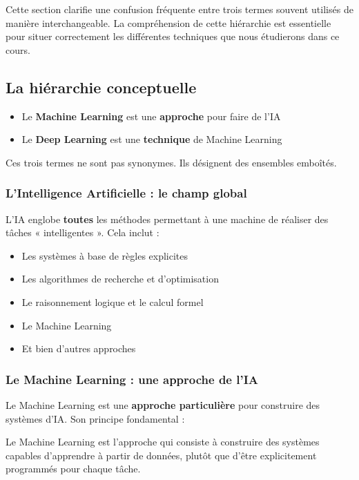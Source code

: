 \documentclass[11pt,a4paper]{article}
\begin{document}
Cette section clarifie une confusion fréquente entre trois termes souvent utilisés de manière interchangeable. La compréhension de cette hiérarchie est essentielle pour situer correctement les différentes techniques que nous étudierons dans ce cours.

\subsection{La hiérarchie conceptuelle}

\begin{retenirbox}
\begin{itemize}
    \item Le \textbf{Machine Learning} est une \textbf{approche} pour faire de l'IA
    \item Le \textbf{Deep Learning} est une \textbf{technique} de Machine Learning
\end{itemize}
Ces trois termes ne sont pas synonymes. Ils désignent des ensembles emboîtés.
\end{retenirbox}

\subsubsection{L'Intelligence Artificielle : le champ global}

L'IA englobe \textbf{toutes} les méthodes permettant à une machine de réaliser des tâches « intelligentes ». Cela inclut :
\begin{itemize}
    \item Les systèmes à base de règles explicites
    \item Les algorithmes de recherche et d'optimisation
    \item Le raisonnement logique et le calcul formel
    \item Le Machine Learning
    \item Et bien d'autres approches
\end{itemize}

\subsubsection{Le Machine Learning : une approche de l'IA}

Le Machine Learning est une \textbf{approche particulière} pour construire des systèmes d'IA. Son principe fondamental :

\begin{definitionbox}
Le Machine Learning est l'approche qui consiste à construire des systèmes capables d'apprendre à partir de données, plutôt que d'être explicitement programmés pour chaque tâche.
\end{definitionbox}
\end{document}
